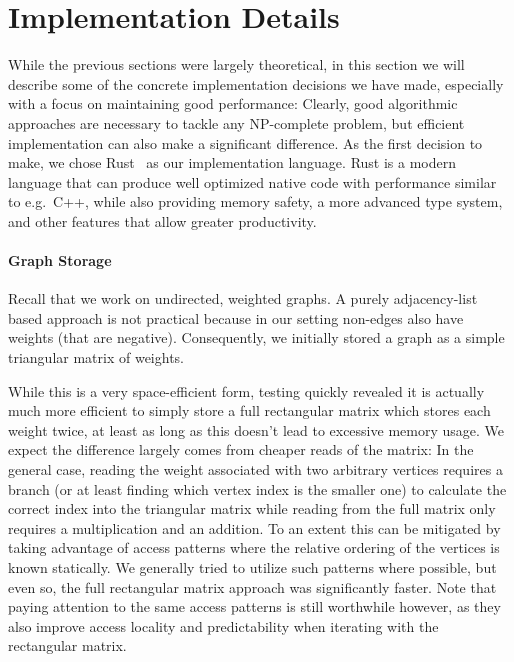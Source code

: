 \documentclass[12pt,oneside,english,parskip=full,headings=small]{scrbook}
\theoremstyle{definition}
\begin{document}
\section{Implementation Details} \label {sec:impl details}

While the previous sections were largely theoretical, in this section we will describe some of the
concrete implementation decisions we have made, especially with a focus on maintaining good
performance: Clearly, good algorithmic approaches are necessary to tackle any NP-complete problem,
but efficient implementation can also make a significant difference. As the first decision to make,
we chose Rust~\cite{Rust} as our implementation language. Rust is a modern language that can produce
well optimized native code with performance similar to e.g.\ C++, while also providing memory
safety, a more advanced type system, and other features that allow greater productivity. 

\paragraph{Graph Storage} Recall that we work on undirected, weighted graphs. A purely
adjacency-list based approach is not practical because in our setting non-edges also have weights
(that are negative). Consequently, we initially stored a graph as a simple triangular matrix of
weights.

While this is a very space-efficient form, testing quickly revealed it is actually much more
efficient to simply store a full rectangular matrix which stores each weight twice, at least as long
as this doesn't lead to excessive memory usage. We expect the difference largely comes from cheaper
reads of the matrix: In the general case, reading the weight associated with two arbitrary vertices
requires a branch (or at least finding which vertex index is the smaller one) to calculate the
correct index into the triangular matrix while reading from the full matrix only requires a
multiplication and an addition. To an extent this can be mitigated by taking advantage of access
patterns where the relative ordering of the vertices is known statically. We generally tried to
utilize such patterns where possible, but even so, the full rectangular matrix approach was
significantly faster. Note that paying attention to the same access patterns is still worthwhile
however, as they also improve access locality and predictability when iterating with the rectangular
matrix.
\end{document}

